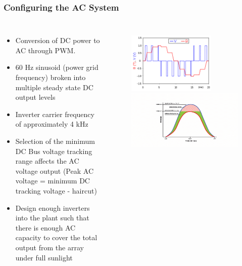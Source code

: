 \documentclass[aspectratio=169]{beamer}
\begin{document}
\begin{frame}
  \frametitle{Configuring the AC System}
  \begin{columns}[t]
    \begin{itemize}
    \item Conversion of DC power to AC through PWM.
    \item 60 Hz sinusoid (power grid frequency) broken into multiple
      steady state DC output levels
    \item Inverter carrier frequency of approximately 4 kHz
    \item Selection of the minimum DC Bus voltage tracking range
      affects the AC voltage output (Peak AC voltage = minimum DC
      tracking voltage - haircut)
    \item Design enough inverters into the plant such that there is
      enough AC capacity to cover the total output from the array
      under full sunlight
    \end{itemize}

    \begin{figure}
      \includegraphics[width=0.75\textwidth]{PWM.png}
      \includegraphics[width=\textwidth]{Inverter_Clipping.png}
    \end{figure}
  \end{columns}
\end{frame}
\end{document}
